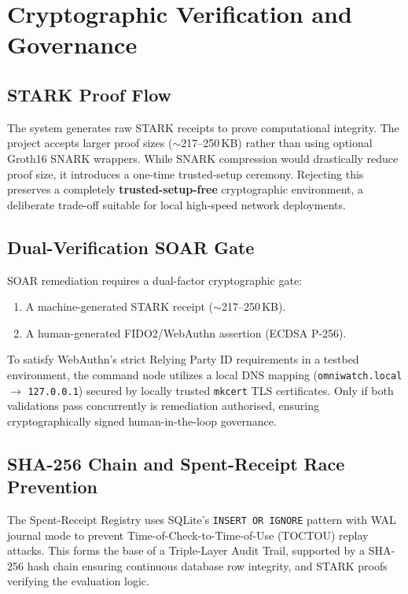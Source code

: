 \documentclass[12pt,a4paper]{article}
\begin{document}
\section{Cryptographic Verification and Governance}

\subsection{STARK Proof Flow}

The system generates raw STARK receipts to prove computational integrity.
The project accepts larger proof sizes ($\sim$217--250\,KB) rather than using
optional Groth16 SNARK wrappers. While SNARK compression would drastically
reduce proof size, it introduces a one-time trusted-setup ceremony. Rejecting
this preserves a completely \textbf{trusted-setup-free} cryptographic environment,
a deliberate trade-off suitable for local high-speed network deployments.

\subsection{Dual-Verification SOAR Gate}

SOAR remediation requires a dual-factor cryptographic gate:

\begin{enumerate}
  \item A machine-generated STARK receipt ($\sim$217--250\,KB).
  \item A human-generated FIDO2/WebAuthn assertion (ECDSA P-256).
\end{enumerate}

To satisfy WebAuthn's strict Relying Party ID requirements in a testbed environment, the command node utilizes a local DNS mapping (\texttt{omniwatch.local} $\rightarrow$ \texttt{127.0.0.1}) secured by locally trusted \texttt{mkcert} TLS certificates. Only if both validations pass concurrently is remediation authorised, ensuring cryptographically signed human-in-the-loop governance.

\subsection{SHA-256 Chain and Spent-Receipt Race Prevention}

The Spent-Receipt Registry uses SQLite's \texttt{INSERT OR IGNORE}
pattern with WAL journal mode to prevent Time-of-Check-to-Time-of-Use
(TOCTOU) replay attacks. This forms the base of a Triple-Layer Audit Trail,
supported by a SHA-256 hash chain ensuring continuous database row integrity,
and STARK proofs verifying the evaluation logic.
\end{document}
